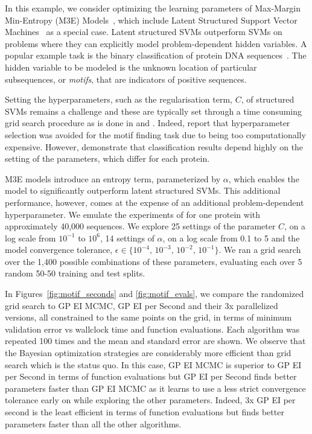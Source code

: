 \documentclass[aos,preprint]{imsart}
\begin{document}
In this example, we consider optimizing the learning parameters of
Max-Margin Min-Entropy (M3E) Models~\citep{Miller-etal-2012}, which
include Latent Structured Support Vector
Machines~\citep{Yu-Joachims-2009} as a special case.  Latent structured
SVMs outperform SVMs on problems where they can explicitly model
problem-dependent hidden variables. A popular example task is the
binary classification of protein DNA
sequences~\citep{Miller-etal-2012,Kumar-etal-2010,Yu-Joachims-2009}.
The hidden variable to be modeled is the unknown location of
particular subsequences, or \emph{motifs}, that are indicators of
positive sequences.

Setting the hyperparameters, such as the regularisation term, $C$, of
structured SVMs remains a challenge and these are typically set
through a time consuming grid search procedure as is done in
\citet{Miller-etal-2012} and \citet{Yu-Joachims-2009}. Indeed,
\citet{Kumar-etal-2010} report that hyperparameter selection was
avoided for the motif finding task due to being too computationally
expensive.  However, \citet{Miller-etal-2012} demonstrate that
classification results depend highly on the setting of the parameters,
which differ for each protein.

M3E models introduce an entropy term, parameterized by $\alpha$, which
enables the model to significantly outperform latent structured
SVMs. This additional performance, however, comes at the expense of an
additional problem-dependent hyperparameter.  We emulate the
experiments of \citet{Miller-etal-2012} for one protein with
approximately 40,000 sequences. We explore 25 settings of the
parameter $C$, on a log scale from $10^{-1}$ to $10^6$, 14 settings of
$\alpha$, on a log scale from 0.1 to 5 and the model convergence
tolerance, ${\epsilon \in
\{10^{-4},\,10^{-3},\,10^{-2},\,10^{-1}\}}$.  We ran a grid search
over the 1,400 possible combinations of these parameters, evaluating
each over 5 random 50-50 training and test splits.

In Figures~\ref{fig:motif_seconds} and \ref{fig:motif_evals}, we
compare the randomized grid search to GP EI MCMC, GP EI per Second and
their 3x parallelized versions, all constrained to the same points on
the grid, in terms of minimum validation error vs wallclock time and
function evaluations. Each algorithm was repeated 100 times and the
mean and standard error are shown. We observe that the Bayesian
optimization strategies are considerably more efficient than grid
search which is the status quo. In this case, GP EI MCMC is superior
to GP EI per Second in terms of function evaluations but GP EI per
Second finds better parameters faster than GP EI MCMC as it learns to
use a less strict convergence tolerance early on while exploring the
other parameters. Indeed, 3x GP EI per second is the least efficient
in terms of function evaluations but finds better parameters faster
than all the other algorithms.
\end{document}
